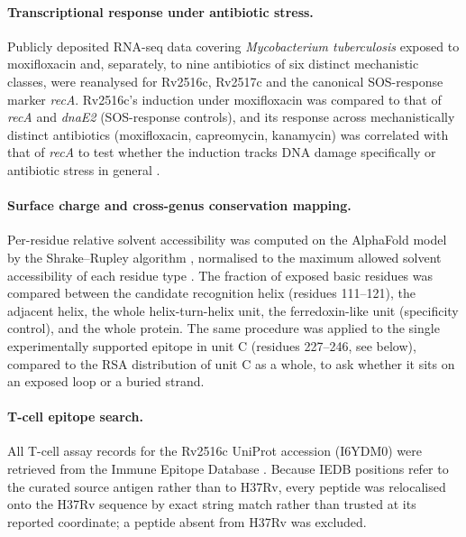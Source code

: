 \documentclass[11pt,a4paper]{article}
\newcommand{\mtb}{\textit{Mycobacterium tuberculosis}}
\begin{document}
\paragraph{Transcriptional response under antibiotic stress.} Publicly deposited RNA-seq data
covering \mtb{} exposed to moxifloxacin and, separately, to nine antibiotics of six distinct
mechanistic classes, were reanalysed for Rv2516c, Rv2517c and the canonical SOS-response marker
\textit{recA}. Rv2516c's induction under moxifloxacin was compared to that of \textit{recA} and
\textit{dnaE2} (SOS-response controls), and its response across mechanistically distinct
antibiotics (moxifloxacin, capreomycin, kanamycin) was correlated with that of \textit{recA} to
test whether the induction tracks DNA damage specifically or antibiotic stress in general
\citep{iacobino2021moxifloxacin}.

\paragraph{Surface charge and cross-genus conservation mapping.} Per-residue relative solvent
accessibility was computed on the AlphaFold model by the Shrake--Rupley algorithm
\citep{shrake1973sasa}, normalised to the maximum allowed solvent accessibility of each residue
type \citep{tien2013maxasa}. The fraction of exposed basic residues was compared between the
candidate recognition helix (residues 111--121), the adjacent helix, the whole helix-turn-helix
unit, the ferredoxin-like unit (specificity control), and the whole protein. The same procedure was
applied to the single experimentally supported epitope in unit C (residues 227--246, see below),
compared to the RSA distribution of unit C as a whole, to ask whether it sits on an exposed loop or
a buried strand.

\paragraph{T-cell epitope search.} All T-cell assay records for the Rv2516c UniProt accession
(I6YDM0) were retrieved from the Immune Epitope Database \citep{vita2019iedb}. Because IEDB
positions refer to the curated source antigen rather than to H37Rv, every peptide was relocalised
onto the H37Rv sequence by exact string match rather than trusted at its reported coordinate; a
peptide absent from H37Rv was excluded.
\end{document}
